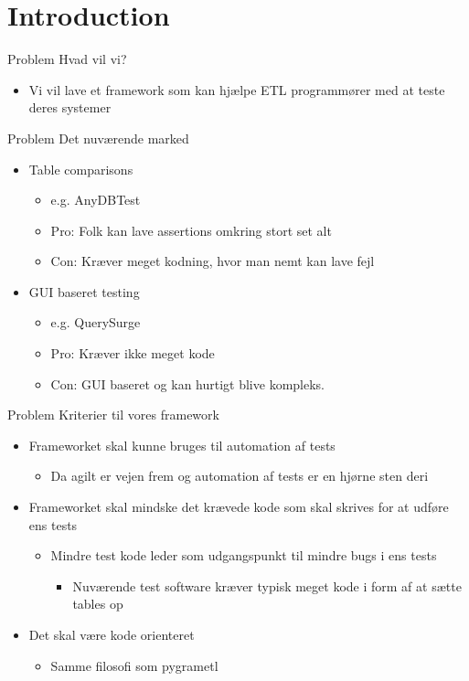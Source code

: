 \section{Introduction}

\begin{frame}{Problem}{}
  Hvad vil vi?
  \begin{itemize}
  \item Vi vil lave et framework som kan hjælpe ETL programmører med at teste deres systemer
  \end{itemize}
\end{frame}

\begin{frame}{Problem}{}
  Det nuværende marked
  \begin{itemize}
  \item<2-> Table comparisons
    \begin{itemize}
    \item e.g. AnyDBTest
    \item Pro: Folk kan lave assertions omkring stort set alt
    \item Con: Kræver meget kodning, hvor man nemt kan lave fejl
    \end{itemize}
  \item<3-> GUI baseret testing
    \begin{itemize}
    \item e.g. QuerySurge
    \item Pro: Kræver ikke meget kode
    \item Con: GUI baseret og kan hurtigt blive kompleks.
    \end{itemize}
  \end{itemize}
\end{frame}


\begin{frame}{Problem}{}
  Kriterier til vores framework
  \begin{itemize}
  \item<2-> Frameworket skal kunne bruges til automation af tests
    \begin{itemize}
    \item Da agilt er vejen frem og automation af tests er en hjørne sten deri
    \end{itemize}
  \item<3-> Frameworket skal mindske det krævede kode som skal skrives for at udføre ens tests
    \begin{itemize}
    \item Mindre test kode leder som udgangspunkt til mindre bugs i ens tests
      \begin{itemize}
      \item Nuværende test software kræver typisk meget kode i form af at sætte tables op
      \end{itemize}
    \end{itemize}
  \item<4-> Det skal være kode orienteret
    \begin{itemize}
    \item Samme filosofi som pygrametl
    \end{itemize}
  \end{itemize}
\end{frame}

